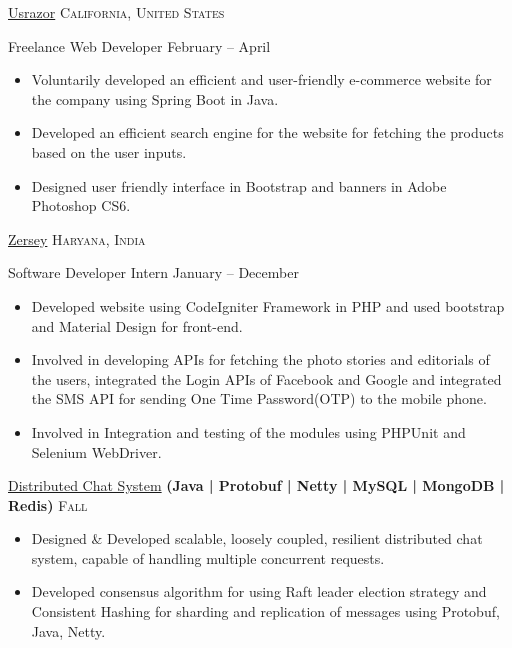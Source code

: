 \documentclass[10pt,a4paper]{article}
\begin{document}
{{{{{\begin{itemize}
    \end{itemize}}}
}

\headedsection  %
  {\href{http://www.usrazor.com/}{Usrazor}}
  {\textsc{California, United States}} {%
  \headedsubsection
    {Freelance Web Developer}
    {February  -- April }
    {\bodytext
    {
    \begin{itemize}
        \item Voluntarily developed an efficient and user-friendly e-commerce website for the company using Spring Boot in Java.
        \item Developed an efficient search engine for the website for fetching the products based on the user inputs.
        \item Designed user friendly interface in Bootstrap and banners in Adobe Photoshop CS6.
       
    \end{itemize}}}
}

\headedsection  %
  {\href{http://www.zersey.com/}{Zersey}}
  {\textsc{Haryana, India}} {%
  \headedsubsection
    {Software Developer Intern}
    {January  -- December }
    {\bodytext
    {
    \begin{itemize}
        \item Developed website using CodeIgniter Framework in PHP and used bootstrap and Material Design for front-end.
        \item Involved in developing APIs for fetching the photo stories and editorials of the users, integrated the Login APIs of Facebook and Google and integrated the SMS API for sending One Time Password(OTP) to the mobile phone.
        \item Involved in Integration and testing of the modules using PHPUnit and Selenium WebDriver.

    \end{itemize}}}
}

\spacedhrule{0.0em}{-0.4em}


\headedsection  %
  {\href{https://www.github.com/rashmishrm/rollbits}{Distributed Chat System}
  \textbf{
  \small{(Java | Protobuf | Netty | MySQL | MongoDB | Redis)}}}
  {\textsc{Fall }} {
  
    {\bodytext
    {
    \begin{itemize}
        \item Designed \& Developed scalable, loosely coupled, resilient distributed chat system, capable of handling multiple concurrent requests.
        \item Developed consensus algorithm for using Raft leader election strategy and Consistent Hashing for sharding and replication of messages using Protobuf, Java, Netty.
    \end{itemize}}}
}

}}
\end{document}
